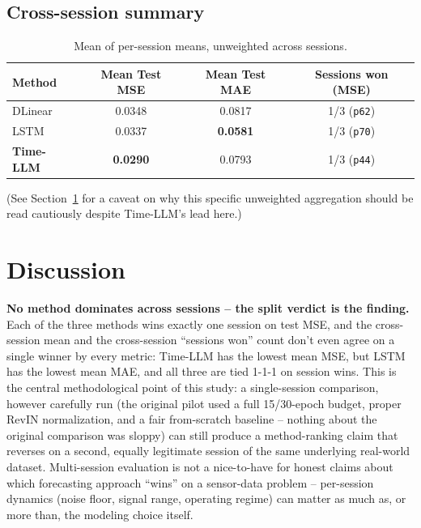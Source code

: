 \documentclass[11pt]{article}
\newcommand{\code}[1]{\texttt{#1}}
\begin{document}
\subsection{Cross-session summary}

\begin{table}[h]
\centering
\caption{Mean of per-session means, unweighted across sessions.}
\begin{tabular}{@{}lccc@{}}
\toprule
Method & Mean Test MSE & Mean Test MAE & Sessions won (MSE) \\
\midrule
DLinear & 0.0348 & 0.0817 & 1/3 (\code{p62}) \\
LSTM & 0.0337 & \textbf{0.0581} & 1/3 (\code{p70}) \\
\textbf{Time-LLM} & \textbf{0.0290} & 0.0793 & 1/3 (\code{p44}) \\
\bottomrule
\end{tabular}
\end{table}

(See Section~\ref{sec:discussion} for a caveat on why this specific
unweighted aggregation should be read cautiously despite Time-LLM's lead
here.)

\section{Discussion}
\label{sec:discussion}

\textbf{No method dominates across sessions -- the split verdict is the
finding.} Each of the three methods wins exactly one session on test MSE,
and the cross-session mean and the cross-session ``sessions won'' count
don't even agree on a single winner by every metric: Time-LLM has the
lowest mean MSE, but LSTM has the lowest mean MAE, and all three are tied
1-1-1 on session wins. This is the central methodological point of this
study: a single-session comparison, however carefully run (the original
pilot used a full 15/30-epoch budget, proper RevIN normalization, and a
fair from-scratch baseline -- nothing about the original comparison was
sloppy) can still produce a method-ranking claim that reverses on a second,
equally legitimate session of the same underlying real-world dataset.
Multi-session evaluation is not a nice-to-have for honest claims about
which forecasting approach ``wins'' on a sensor-data problem -- per-session
dynamics (noise floor, signal range, operating regime) can matter as much
as, or more than, the modeling choice itself.
\end{document}
